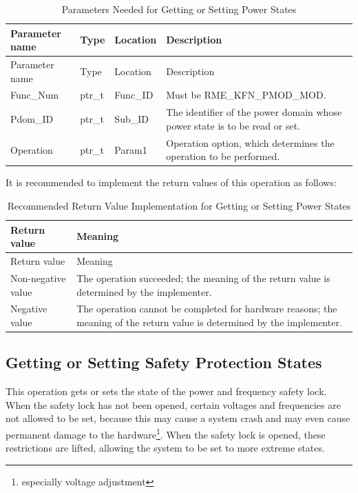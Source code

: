 \begin{xltabular}{\textwidth}{@{}>{\hsize\raggedright\arraybackslash}X>{\hsize\raggedright\arraybackslash}X>{\hsize\raggedright\arraybackslash}X>{\hsize\raggedright\arraybackslash}X@{}}
\caption{Parameters Needed for Getting or Setting Power States}\label{tab:8-53-get-or-set-power-state-parameters}\\
\toprule
Parameter name & Type & Location & Description\tabularnewline
\endfirsthead
\toprule
Parameter name & Type & Location & Description\tabularnewline
\midrule
\endhead
\bottomrule
\endlastfoot
Func\_Num & ptr\_t & Func\_ID & Must be RME\_KFN\_PMOD\_MOD.\tabularnewline
Pdom\_ID & ptr\_t & Sub\_ID &
The identifier of the power domain whose power state is to be read or set.\tabularnewline
Operation & ptr\_t & Param1 &
Operation option, which determines the operation to be performed.\tabularnewline
\end{xltabular}
\nopagebreak[4]

It is recommended to implement the return values of this operation as follows:

\begin{xltabular}{\textwidth}{@{}>{\hsize\raggedright\arraybackslash}X>{\hsize\raggedright\arraybackslash}X@{}}
\caption{Recommended Return Value Implementation for Getting or Setting Power States}\label{tab:8-54-get-or-set-power-state-suggested-return-values}\\
\toprule
Return value & Meaning\tabularnewline
\endfirsthead
\toprule
Return value & Meaning\tabularnewline
\midrule
\endhead
\bottomrule
\endlastfoot
    Non-negative value & The operation succeeded; the meaning of the return value is determined by the implementer.\tabularnewline
    Negative value & The operation cannot be completed for hardware reasons; the meaning of the return value is determined by the implementer.\tabularnewline
\end{xltabular}
\nopagebreak[4]

\subsection{Getting or Setting Safety Protection States}\label{subsec:8-get-or-set-safety-protection-state}

This operation gets or sets the state of the power and frequency safety lock. When the safety lock has not been opened, certain voltages and frequencies are not allowed to be set, because this may cause a system crash and may even cause permanent damage to the hardware\footnote{especially voltage adjustment}. When the safety lock is opened, these restrictions are lifted, allowing the system to be set to more extreme states.

